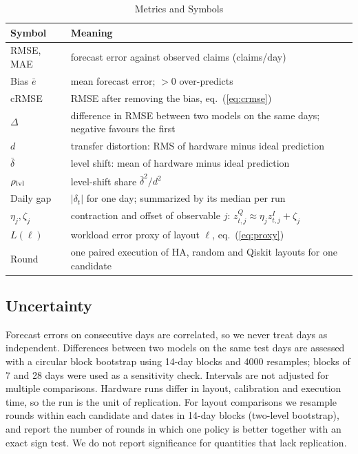 \documentclass[journal]{IEEEtran}
\begin{document}
\begin{table}[t]
\centering
\caption{Metrics and Symbols}
\label{tab:metrics}
\footnotesize
\setlength{\tabcolsep}{3pt}
\begin{tabular}{@{}p{1.6cm}p{6.6cm}@{}}
\toprule
Symbol & Meaning \\
\midrule
RMSE, MAE & forecast error against observed claims (claims/day) \\
Bias $\bar e$ & mean forecast error; $>0$ over-predicts \\
cRMSE & RMSE after removing the bias, eq.~(\ref{eq:crmse}) \\
$\Delta$ & difference in RMSE between two models on the same days; negative favours the first \\
$d$ & transfer distortion: RMS of hardware minus ideal prediction \\
$\bar\delta$ & level shift: mean of hardware minus ideal prediction \\
$\rho_{\rm lvl}$ & level-shift share $\bar\delta^2/d^2$ \\
Daily gap & $|\delta_t|$ for one day; summarized by its median per run \\
$\eta_j,\zeta_j$ & contraction and offset of observable $j$: $z^Q_{t,j}\approx\eta_j z^I_{t,j}+\zeta_j$ \\
$L(\ell)$ & workload error proxy of layout $\ell$, eq.~(\ref{eq:proxy}) \\
Round & one paired execution of HA, random and Qiskit layouts for one candidate \\
\bottomrule
\end{tabular}
\end{table}

\subsection{Uncertainty}
Forecast errors on consecutive days are correlated, so we never treat days as independent. Differences between two models on the same test days are assessed with a circular block bootstrap \cite{Politis1992Circular} using 14-day blocks and 4000 resamples; blocks of 7 and 28 days were used as a sensitivity check. Intervals are not adjusted for multiple comparisons. Hardware runs differ in layout, calibration and execution time, so the run is the unit of replication. For layout comparisons we resample rounds within each candidate and dates in 14-day blocks (two-level bootstrap), and report the number of rounds in which one policy is better together with an exact sign test. We do not report significance for quantities that lack replication.
\end{document}
